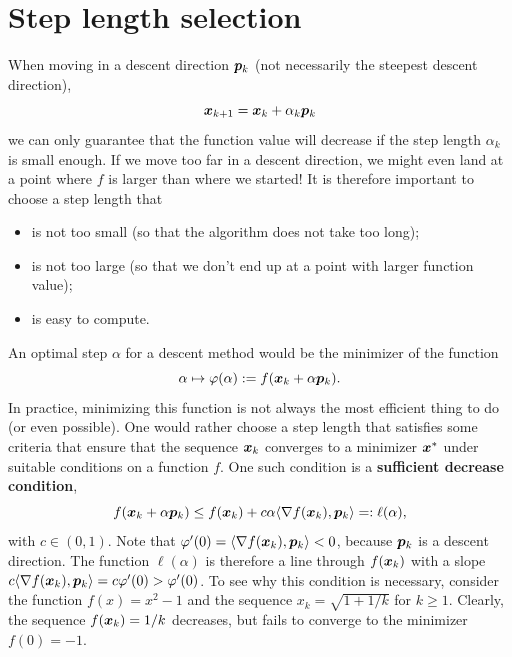 \section{Step length selection}\label{sec:steplength}
When moving in a descent direction $\bm{p}_k$ (not necessarily the steepest descent direction), 
\begin{equation*}
  \bm{x}_{k+1} = \bm{x}_k+\alpha_k \bm{p}_k
\end{equation*}
we can only guarantee that the function value will decrease if the step length $\alpha_k$ is small enough. If we move too far in a descent direction, we might even land at a point where $f$ is larger than where we started! It is therefore important to choose a step length that 
\begin{itemize}
\item is not too small (so that the algorithm does not take too long);
\item is not too large (so that we don't end up at a point with larger function value);
\item is easy to compute.
\end{itemize} 

An optimal step $\alpha$ for a descent method would be the minimizer of the function
\begin{equation*}
 \alpha \mapsto \varphi(\alpha) := f(\bm{x}_k+\alpha \bm{p}_k).
\end{equation*}
In practice, minimizing this function is not always the most efficient thing to do (or even possible). One would rather choose a step length that satisfies some criteria that ensure that the sequence $\bm{x}_k$ converges to a minimizer $\bm{x}^*$ under suitable conditions on a function $f$. One such condition is a \textbf{sufficient decrease condition},
\begin{equation*}
 f(\bm{x}_k+\alpha \bm{p}_k) \leq f(\bm{x}_k) + c \alpha\langle {\nabla f(\bm{x}_k)}, {\bm{p}_k} \rangle =: \ell(\alpha),
\end{equation*}
with $c\in (0,1)$. Note that $\varphi'(0) = \langle {\nabla f(\bm{x}_k)}, {\bm{p}_k} \rangle <0$, because $\bm{p}_k$ is a descent direction. The function $\ell(\alpha)$ is therefore a line through $f(\bm{x}_k)$ with a slope $c \langle {\nabla f(\bm{x}_k)}, {\bm{p}_k} \rangle = c\varphi'(0)>\varphi'(0)$. To see why this condition is necessary, consider the function $f(x)=x^2-1$ and the sequence $x_k = \sqrt{1+1/k}$ for $k\geq 1$. Clearly, the sequence $f(\bm{x}_k)=1/k$ decreases, but fails to converge to the minimizer $f(0)=-1$.

